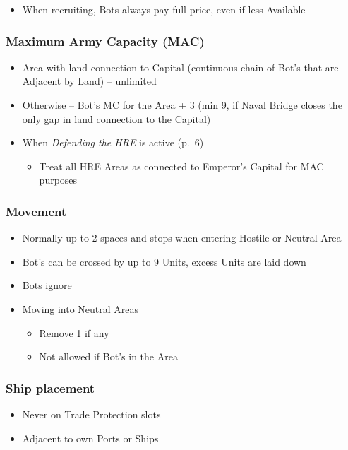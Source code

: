 \documentclass[10pt]{article}
\begin{document}
\begin{itemize}
	\item When recruiting, Bots always pay full \botpower price, even if less Available \manpower
\end{itemize}

\subsubsection*{Maximum Army Capacity (MAC)}
\begin{itemize}
	\item Area with land connection to Capital (continuous chain of Bot's \towns that are Adjacent by Land) -- unlimited
	\item Otherwise -- Bot's MC for the Area + 3 (min 9, if Naval Bridge closes the only gap in land connection to the Capital)
	\item When \emph{Defending the HRE} is active (p.~6)
	\begin{itemize}
		\item Treat all HRE Areas as connected to Emperor's Capital for MAC purposes
	\end{itemize}
\end{itemize}

\subsubsection*{Movement}
\begin{itemize}
	\item Normally up to 2 spaces and stops when entering Hostile or Neutral Area
	\item Bot's  can be crossed by up to 9 Units, excess Units are laid down
	\item Bots ignore 
	\item Moving into Neutral Areas
	\begin{itemize}
		\item Remove 1 \influence if any
		\item Not allowed if Bot's \claim in the Area
	\end{itemize}
\end{itemize}

\subsubsection*{Ship placement}
\begin{itemize}
	\item Never on Trade Protection slots
	\item Adjacent to own Ports or Ships
\end{itemize}
\end{document}
